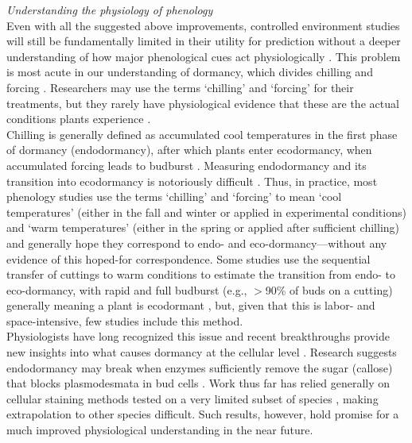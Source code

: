 \documentclass[11pt,letter]{article}
\begin{document}
\emph{Understanding the physiology of phenology}\\
Even with all the suggested above improvements, controlled environment studies will still be fundamentally limited in their utility for prediction without a deeper understanding of how major phenological cues act physiologically \citep{Bahuguna2015}. This problem is most acute in our understanding of dormancy, which divides chilling and forcing \citep{singh2019,chang2021}. Researchers may use the terms `chilling' and `forcing' for their treatments, but they rarely have physiological evidence that these are the actual conditions plants experience \citep[][]{chuine2016}. \\

Chilling is generally defined as accumulated cool temperatures in the first phase of dormancy (endodormancy), after which plants enter ecodormancy, when accumulated forcing leads to budburst \citep{chuine2016}. Measuring endodormancy and its transition into ecodormancy is notoriously difficult  \citep[e.g.,][]{Junttila:2012aa}. Thus, in practice, most phenology studies use the terms `chilling' and `forcing' to mean `cool temperatures' (either in the fall and winter or applied in experimental conditions) and `warm temperatures' (either in the spring or applied after sufficient chilling) and generally hope they correspond to endo- and eco-dormancy---without any evidence of this hoped-for correspondence. Some studies use the sequential transfer of cuttings to warm conditions to estimate the transition from endo- to eco-dormancy, with rapid and full budburst (e.g., $>$90\% of buds on a cutting) generally meaning a plant is ecodormant \citep[e.g.,][]{Junttila:2012aa}, but, given that this is labor- and space-intensive, few studies include this method.\\

Physiologists have long recognized this issue and recent breakthroughs provide new insights into what causes dormancy at the cellular level \citep{vanderschoot2014}. Research suggests endodormancy may break when enzymes sufficiently remove the sugar (callose) that blocks plasmodesmata in bud cells \citep[reviewed in][]{chang2021}. Work thus far has relied generally on cellular staining methods tested on a very limited subset of species \citep{rinne2011,singh2019}, making extrapolation to other species difficult. Such results, however, hold promise for a much improved physiological understanding in the near future.\\
\end{document}
